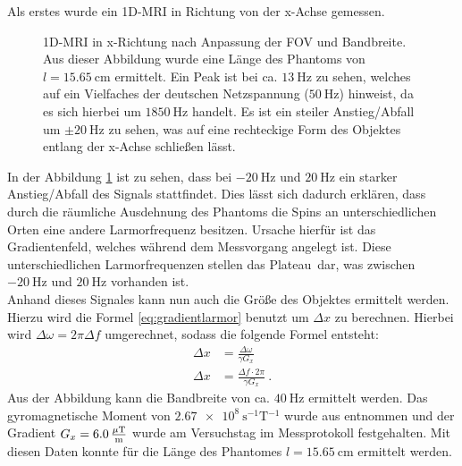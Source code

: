 Als erstes wurde ein 1D-MRI in Richtung von der x-Achse gemessen.
\begin{figure}[H]
    \centering
    
    \caption[1D-MRI in x-Richtung nach Anpassung der FOV und Bandbreite]{1D-MRI in x-Richtung nach Anpassung der FOV und Bandbreite. Aus dieser Abbildung wurde eine Länge des Phantoms von $l=\SI{15,65}{\centi\m}$ ermittelt. Ein Peak ist bei ca. $\SI{13}{\hertz}$ zu sehen, welches auf ein Vielfaches der deutschen Netzspannung ($\SI{50}{\hertz}$) hinweist, da es sich hierbei um $\SI{1850}{\hertz}$ handelt. Es ist ein steiler Anstieg/Abfall um $\pm \SI{20}{\hertz}$ zu sehen, was auf eine \glqq rechteckige\grqq{} Form des Objektes entlang der x-Achse schließen lässt.\label{fig:1Dx}}
\end{figure}
In der Abbildung \ref{fig:1Dx} ist zu sehen, dass bei $\SI{-20}{\hertz}$ und $\SI{20}{\hertz}$ ein starker Anstieg/Abfall des Signals stattfindet. Dies lässt sich dadurch erklären, dass durch die räumliche Ausdehnung des Phantoms die Spins an unterschiedlichen Orten eine andere Larmorfrequenz besitzen. Ursache hierfür ist das Gradientenfeld, welches während dem Messvorgang angelegt ist. Diese unterschiedlichen Larmorfrequenzen stellen das \glqq Plateau\grqq \, dar, was zwischen $\SI{-20}{\hertz}$ und $\SI{20}{\hertz}$ vorhanden ist.\\
Anhand dieses Signales kann  nun auch die Größe des Objektes ermittelt werden. Hierzu wird die Formel \ref{eq:gradientlarmor} benutzt um $\Delta x$ zu berechnen. Hierbei wird $\Delta\omega= 2\pi \Delta f$ umgerechnet, sodass die folgende Formel entsteht:
\begin{align}
    \Delta x&=\frac{\Delta\omega}{\gamma G_x}\\
    \Delta x&=\frac{\Delta f \cdot 2\pi}{\gamma G_x} \ .
    \label{eq:FOV}
\end{align}
Aus der Abbildung kann die Bandbreite von ca. $\SI{40}{\hertz}$ ermittelt werden. 
Das gyromagnetische Moment von $\SI{2.67e8}{\s^{-1}\tesla^{-1}}$ wurde aus \cite{Schmidt} entnommen und der Gradient $G_x=\SI{6,0}{\frac{\mu\tesla}{\m}}$ wurde am Versuchstag im Messprotokoll festgehalten.
Mit diesen Daten konnte für die Länge des Phantomes $l=\SI{15,65}{\centi\m}$ ermittelt werden.\\
